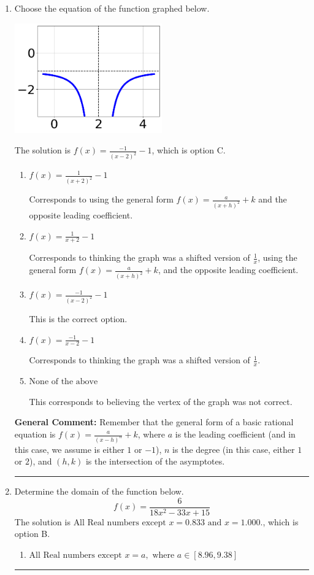 \documentclass{extbook}[14pt]
\newcommand{\litem}[1]{\item #1

\rule{\textwidth}{0.4pt}}
\begin{document}
\begin{enumerate}\litem{
Choose the equation of the function graphed below.

\begin{center}
    \includegraphics[width=0.5\textwidth]{../Figures/rationalGraphToEquationB.png}
\end{center}


The solution is \( f(x) = \frac{-1}{(x - 2)^2} - 1 \), which is option C.\begin{enumerate}[label=\Alph*.]
\item \( f(x) = \frac{1}{(x + 2)^2} - 1 \)

Corresponds to using the general form $f(x) = \frac{a}{(x+h)^2}+k$ and the opposite leading coefficient.
\item \( f(x) = \frac{1}{x + 2} - 1 \)

Corresponds to thinking the graph was a shifted version of $\frac{1}{x}$, using the general form $f(x) = \frac{a}{(x+h)^2}+k$, and the opposite leading coefficient.
\item \( f(x) = \frac{-1}{(x - 2)^2} - 1 \)

This is the correct option.
\item \( f(x) = \frac{-1}{x - 2} - 1 \)

Corresponds to thinking the graph was a shifted version of $\frac{1}{x}$.
\item \( \text{None of the above} \)

This corresponds to believing the vertex of the graph was not correct.
\end{enumerate}

\textbf{General Comment:} Remember that the general form of a basic rational equation is $ f(x) = \frac{a}{(x-h)^n} + k$, where $a$ is the leading coefficient (and in this case, we assume is either $1$ or $-1$), $n$ is the degree (in this case, either $1$ or $2$), and $(h, k)$ is the intersection of the asymptotes.
}
\litem{
Determine the domain of the function below.
\[ f(x) = \frac{6}{18x^{2} -33 x + 15} \]The solution is \( \text{All Real numbers except } x = 0.833 \text{ and } x = 1.000. \), which is option B.\begin{enumerate}[label=\Alph*.]
\item \( \text{All Real numbers except } x = a, \text{ where } a \in [8.96, 9.38] \)


\end{enumerate}}
\end{enumerate}
\end{document}
